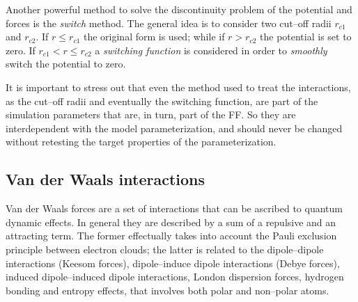 Another powerful method to solve the discontinuity problem of the potential and forces is the \textit{switch} 
method. The general idea is to consider two cut--off radii  $r_{c1}$ and $r_{c2}$. If $r \le r_{c1}$ the original 
form is used; while if $r > r_{c2}$ the potential is set to zero. If $r_{c1} < r \le r_{c2}$ a \textit{switching 
function} is considered in order to \textit{smoothly} switch the potential to zero.

It is important to stress out that even the method used to treat the interactions, as the cut--off radii and 
eventually the switching function, are part of the simulation parameters that are, in turn, part of the \ac{FF}. 
So they are interdependent with the model parameterization, and should never be changed without retesting the 
target properties of the parameterization.

\subsection{Van der Waals interactions}
Van der Waals forces are a set of interactions that can be ascribed to quantum dynamic effects. In general they 
are described by a sum of a repulsive and an attracting term. The former effectually takes into account the Pauli 
exclusion principle between electron clouds; the latter is related to the dipole--dipole interactions (Keesom 
forces), dipole--induce dipole interactions (Debye forces), induced dipole--induced dipole interactions, London 
dispersion forces, hydrogen bonding and entropy effects, that involves both polar and non--polar atoms. 

